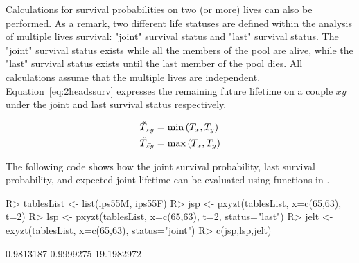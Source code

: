 \documentclass[nojss]{jss}
\begin{document}
Calculations for survival probabilities on two (or more) lives can also be performed.
 As a remark, two different life statuses are defined within the analysis of multiple lives
survival: "joint" survival status and "last" survival status. The
"joint" survival status exists while all the members of the pool are alive,
while the "last" survival status exists until the last member of the pool dies.
All calculations assume that the multiple lives are independent.
Equation~\ref{eq:2headssurv} expresses the remaining future lifetime on a couple $xy$ under the joint and last survival status
respectively. 

\begin{equation}
\begin{gathered}
  \tilde T_{xy} = \min \left( T_x,T_y \right) \hfill \\
  \tilde T_{\bar{xy}} = \max \left( T_x,T_y \right) \hfill \\ 
\end{gathered}
\label{eq:2headssurv}
\end{equation}


The following code shows how the joint survival probability, last survival probability, and 
expected joint lifetime can be evaluated using functions in  .

\begin{Schunk}
\begin{Sinput}
R> tablesList <- list(ips55M, ips55F)
R> jsp <- pxyzt(tablesList, x=c(65,63), t=2)
R> lsp <- pxyzt(tablesList, x=c(65,63), t=2, status="last") 
R> jelt <- exyzt(tablesList, x=c(65,63), status="joint") 
R> c(jsp,lsp,jelt)
\end{Sinput}
\begin{Soutput}
[1]  0.9813187  0.9999275 19.1982972
\end{Soutput}
\end{Schunk}
\end{document}

